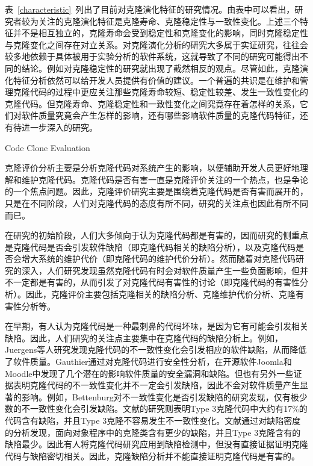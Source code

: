 表~\ref{characteristic}~列出了目前对克隆演化特征的研究情况。由表中可以看出，研究者较为关注的克隆演化特征是克隆寿命、克隆稳定性与一致性变化。上述三个特征并不是相互独立的，克隆寿命会受到稳定性和克隆变化的影响，同时克隆稳定性与克隆变化之间存在对立关系。对克隆演化分析的研究大多属于实证研究，往往会较多地依赖于具体被用于实验分析的软件系统，这就导致了不同的研究可能得出不同的结论。例如对克隆稳定性的研究就出现了截然相反的观点。尽管如此，克隆演化特征分析依然可以给开发人员提供有价值的建议。一个普遍的共识是在维护和管理克隆代码的过程中更应关注那些克隆寿命较短、稳定性较差、发生一致性变化的克隆代码。但克隆寿命、克隆稳定性和一致性变化之间究竟存在着怎样的关系，它们对软件质量究竟会产生怎样的影响，还有哪些影响软件质量的克隆代码特征，还有待进一步深入的研究。

{Code Clone Evaluation}

克隆评价分析主要是分析克隆代码对系统产生的影响，以便辅助开发人员更好地理解和维护克隆代码。克隆代码是否有害一直是克隆评价关注的一个热点，也是争论的一个焦点问题。因此，克隆评价研究主要是围绕着克隆代码是否有害而展开的，只是在不同阶段，人们对克隆代码的态度有所不同，研究的关注点也因此有所不同而已。

在研究的初始阶段，人们大多倾向于认为克隆代码都是有害的，因而研究的侧重点是克隆代码是否会引发软件缺陷（即克隆代码相关的缺陷分析），以及克隆代码是否会增大系统的维护代价（即克隆代码的维护代价分析）。然而随着对克隆代码研究的深入，人们研究发现虽然克隆代码有时会对软件质量产生一些负面影响，但并不一定都是有害的，从而引发了对克隆代码有害性的讨论（即克隆代码的有害性分析）。因此，克隆评价主要包括克隆相关的缺陷分析、克隆维护代价分析、克隆有害性分析等。

在早期，有人认为克隆代码是一种最刺鼻的代码坏味，是因为它有可能会引发相关缺陷。因此，人们研究的关注点主要集中在克隆代码的缺陷分析上。例如，Juergens等人研究发现克隆代码的不一致性变化会引发相应的软件缺陷，从而降低了软件质量\cite{juergens2009code}。Gauthier通过对克隆代码进行安全性分析，在开源软件Joomla和Moodle中发现了几个潜在的影响软件质量的安全漏洞和缺陷\cite{gauthier2013uncovering}。但也有另外一些证据表明克隆代码的不一致性变化并不一定会引发缺陷，因此不会对软件质量产生显著的影响。例如，Bettenburg对不一致性变化是否引发缺陷的研究发现，仅有极少数的不一致性变化会引发缺陷\cite{bettenburg2009empirical}。文献\cite{wagner2016relationship}的研究则表明Type 3克隆代码中大约有17\%的代码含有缺陷，并且Type 3克隆不容易发生不一致性变化。文献\cite{elish2015fault}通过对缺陷密度的分析发现，面向对象程序中的克隆类含有更少的缺陷，并且Type 3克隆含有的缺陷最少。因此有人将克隆代码研究应用到缺陷检测中，但没有直接证据证明克隆代码与缺陷密切相关\cite{lo2012active}\cite{kamei2011empirical}。因此，克隆缺陷分析并不能直接证明克隆代码是有害的。

